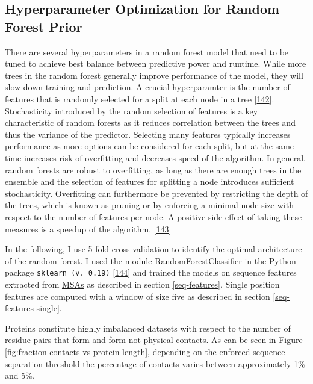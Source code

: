 \documentclass[12pt,a4paper,twoside]{book}
\theoremstyle{definition}
\theoremstyle{definition}
\theoremstyle{remark}
\begin{document}
\subsection{Hyperparameter Optimization for Random Forest
Prior}\label{rf-hyperparameter-optimization}

There are several hyperparameters in a random forest model that need to
be tuned to achieve best balance between predictive power and runtime.
While more trees in the random forest generally improve performance of
the model, they will slow down training and prediction. A crucial
hyperparamter is the number of features that is randomly selected for a
split at each node in a tree
{[}\protect\hyperlink{ref-Bernard2009}{142}{]}. Stochasticity introduced
by the random selection of features is a key characteristic of random
forests as it reduces correlation between the trees and thus the
variance of the predictor. Selecting many features typically increases
performance as more options can be considered for each split, but at the
same time increases risk of overfitting and decreases speed of the
algorithm. In general, random forests are robust to overfitting, as long
as there are enough trees in the ensemble and the selection of features
for splitting a node introduces sufficient stochasticity. Overfitting
can furthermore be prevented by restricting the depth of the trees,
which is known as pruning or by enforcing a minimal node size with
respect to the number of features per node. A positive side-effect of
taking these measures is a speedup of the algorithm.
{[}\protect\hyperlink{ref-Louppe2014}{143}{]}

In the following, I use 5-fold cross-validation to identify the optimal
architecture of the random forest. I used the module
\href{http://scikit-learn.org/stable/modules/generated/sklearn.ensemble.RandomForestClassifier.html\#sklearn.ensemble.RandomForestClassifier}{RandomForestClassifier}
in the Python package \texttt{sklearn\ (v.\ 0.19)}
{[}\protect\hyperlink{ref-Pedregosa2011}{144}{]} and trained the models
on sequence features extracted from \protect\hyperlink{abbrev}{MSAs} as
described in section \ref{seq-features}. Single position features are
computed with a window of size five as described in section
\ref{seq-features-single}.

Proteins constitute highly imbalanced datasets with respect to the
number of residue pairs that form and form not physical contacts. As can
be seen in Figure \ref{fig:fraction-contacts-vs-protein-length},
depending on the enforced sequence separation threshold the percentage
of contacts varies between approximately 1\% and 5\%.
\end{document}
